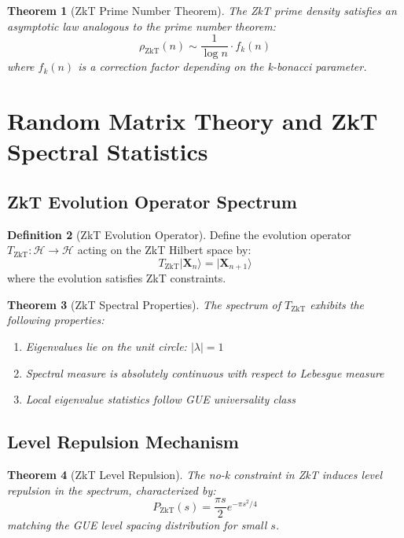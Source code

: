 \documentclass[12pt]{article}
\theoremstyle{plain}
\newtheorem{theorem}{Theorem}[section]
\theoremstyle{definition}
\newtheorem{definition}[theorem]{Definition}
\newcommand{\cH}{\mathcal{H}}
\begin{document}
\begin{theorem}[ZkT Prime Number Theorem]
The ZkT prime density satisfies an asymptotic law analogous to the prime number theorem:
\begin{equation}
\rho_{\text{ZkT}}(n) \sim \frac{1}{\log n} \cdot f_k(n)
\end{equation}
where $f_k(n)$ is a correction factor depending on the k-bonacci parameter.
\end{theorem}

\section{Random Matrix Theory and ZkT Spectral Statistics}

\subsection{ZkT Evolution Operator Spectrum}

\begin{definition}[ZkT Evolution Operator]
Define the evolution operator $T_{\text{ZkT}}: \cH \to \cH$ acting on the ZkT Hilbert space by:
\begin{equation}
T_{\text{ZkT}} |\mathbf{X}_n\rangle = |\mathbf{X}_{n+1}\rangle
\end{equation}
where the evolution satisfies ZkT constraints.
\end{definition}

\begin{theorem}[ZkT Spectral Properties]
The spectrum of $T_{\text{ZkT}}$ exhibits the following properties:
\begin{enumerate}
\item Eigenvalues lie on the unit circle: $|\lambda| = 1$
\item Spectral measure is absolutely continuous with respect to Lebesgue measure
\item Local eigenvalue statistics follow GUE universality class
\end{enumerate}
\end{theorem}

\subsection{Level Repulsion Mechanism}

\begin{theorem}[ZkT Level Repulsion]
The no-k constraint in ZkT induces level repulsion in the spectrum, characterized by:
\begin{equation}
P_{\text{ZkT}}(s) = \frac{\pi s}{2} e^{-\pi s^2/4}
\end{equation}
matching the GUE level spacing distribution for small $s$.
\end{theorem}
\end{document}
